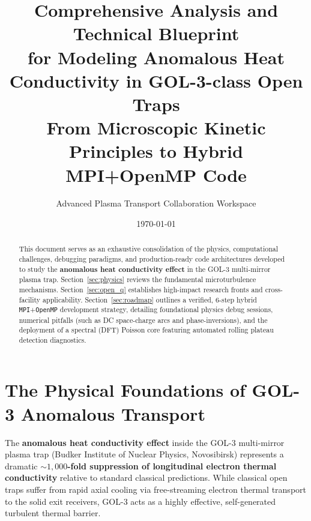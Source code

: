 \documentclass[11pt,a4paper]{article}
\title{Comprehensive Analysis and Technical Blueprint \\ for Modeling Anomalous Heat Conductivity in GOL-3-class Open Traps \\ \large From Microscopic Kinetic Principles to Hybrid MPI+OpenMP Code}
\author{Advanced Plasma Transport Collaboration Workspace}
\date{\today}
\begin{document}
\maketitle

\begin{abstract}
This document serves as an exhaustive consolidation of the physics, computational challenges, debugging paradigms, and production-ready code architectures developed to study the \textbf{anomalous heat conductivity effect} in the GOL-3 multi-mirror plasma trap. Section~\ref{sec:physics} reviews the fundamental microturbulence mechanisms. Section~\ref{sec:open_q} establishes high-impact research fronts and cross-facility applicability. Section~\ref{sec:roadmap} outlines a verified, 6-step hybrid \texttt{MPI}+\texttt{OpenMP} development strategy, detailing foundational physics debug sessions, numerical pitfalls (such as DC space-charge arcs and phase-inversions), and the deployment of a spectral (DFT) Poisson core featuring automated rolling plateau detection diagnostics.
\end{abstract}

\section{The Physical Foundations of GOL-3 Anomalous Transport}\label{sec:physics}
The \textbf{anomalous heat conductivity effect} inside the GOL-3 multi-mirror plasma trap (Budker Institute of Nuclear Physics, Novosibirsk) represents a dramatic \textbf{\(\sim 1,000\)-fold suppression of longitudinal electron thermal conductivity} relative to standard classical predictions. While classical open traps suffer from rapid axial cooling via free-streaming electron thermal transport to the solid exit receivers, GOL-3 acts as a highly effective, self-generated turbulent thermal barrier.
\end{document}
